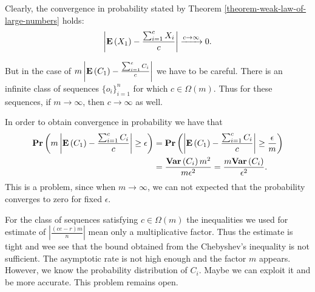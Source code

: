 Clearly, the convergence in probability stated by Theorem \ref{theorem-weak-law-of-large-numbers} holds:
\[
	\left|\mathbf{E}\left(X_1\right) - \frac{\sum\displaylimits_{i = 1}^{c} X_i}{c}\right| \xrightarrow{c \rightarrow \infty} 0 \text{.}
\]

But in the case of $m \left|\mathbf{E}\left(C_1\right) - \frac{\sum\displaylimits_{i = 1}^{c} C_i}{c}\right|$ we have to be careful. There is an infinite class of sequences $\{o_i\}_{i = 1}^{n}$ for which $c \in \Omega(m)$. Thus for these sequences, if $m \rightarrow \infty$, then $c \rightarrow \infty$ as well.

In order to obtain convergence in probability we have that
\[
\begin{split}
\mathbf{Pr}\left(m \left|\mathbf{E}\left(C_1\right) - \frac{\sum\displaylimits_{i = 1}^{c} C_i}{c}\right| \geq \epsilon\right) 
	& = \mathbf{Pr}\left(\left|\mathbf{E}\left(C_1\right) - \frac{\sum\displaylimits_{i = 1}^{c} C_i}{c}\right| \geq \frac{\epsilon}{m}\right)  \\
	& = \frac{\mathbf{Var}\left(C_i\right) m ^ 2}{m \epsilon ^ 2} = \frac{m\mathbf{Var}\left(C_i\right)}{\epsilon ^ 2} \text{.}
\end{split}
\]
This is a problem, since when $m \rightarrow \infty$, we can not expected that the probability converges to zero for fixed $\epsilon$. 

For the class of sequences satisfying $c \in \Omega(m)$ the inequalities we used for estimate of $\left|\frac{(ce - r)m}{n}\right|$ mean only a multiplicative factor. Thus the estimate is tight and wee see that the bound obtained from the Chebyshev's inequality is not sufficient. The asymptotic rate is not high enough and the factor $m$ appears. However, we know the probability distribution of $C_i$. Maybe we can exploit it and be more accurate. This problem remains open.



